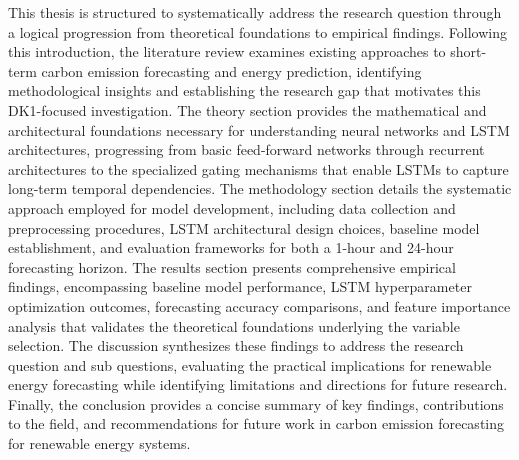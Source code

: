 This thesis is structured to systematically address the research question through a logical progression from theoretical foundations to empirical findings. Following this introduction, the literature review examines existing approaches to short-term carbon emission forecasting and energy prediction, identifying methodological insights and establishing the research gap that motivates this DK1-focused investigation. The theory section provides the mathematical and architectural foundations necessary for understanding neural networks and LSTM architectures, progressing from basic feed-forward networks through recurrent architectures to the specialized gating mechanisms that enable LSTMs to capture long-term temporal dependencies. The methodology section details the systematic approach employed for model development, including data collection and preprocessing procedures, LSTM architectural design choices, baseline model establishment, and evaluation frameworks for both a 1-hour and 24-hour forecasting horizon. The results section presents comprehensive empirical findings, encompassing baseline model performance, LSTM hyperparameter optimization outcomes, forecasting accuracy comparisons, and feature importance analysis that validates the theoretical foundations underlying the variable selection. The discussion synthesizes these findings to address the research question and sub questions, evaluating the practical implications for renewable energy forecasting while identifying limitations and directions for future research. Finally, the conclusion provides a concise summary of key findings, contributions to the field, and recommendations for future work in carbon emission forecasting for renewable energy systems.
